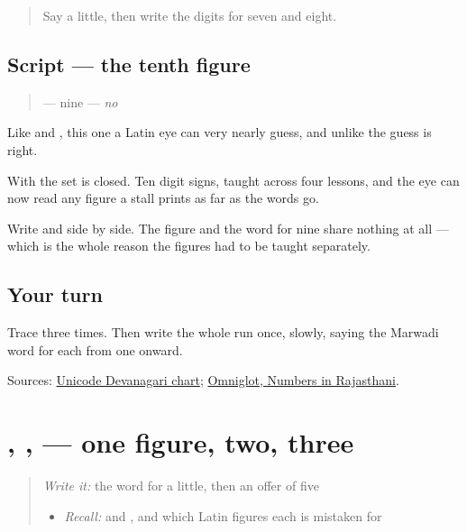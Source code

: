 \label{lesson:MW-W35-digit-nine}



\begin{quote}
Say a little, then write the digits for seven and eight.
\end{quote}

\subsection*{Script — the tenth figure}
\begin{quote}
\textbf{} — nine — \emph{no}
\end{quote}

Like \textbf{} and \textbf{}, this one a Latin eye can very nearly guess, and unlike \textbf{} the guess is right.

With \textbf{} the set is closed. Ten digit signs, taught across four lessons, and the eye can now read any figure a stall prints as far as the words go.

Write \textbf{} and \textbf{} side by side. The figure and the word for nine share nothing at all — which is the whole reason the figures had to be taught separately.

\subsection*{Your turn}
Trace \textbf{} three times. Then write the whole run \textbf{         } once, slowly, saying the Marwadi word for each from one onward.

\begin{tcolorbox}[breakable,colback=teal!4,colframe=teal!35!black,title={Before you move on}]
Sources: \href{https://www.unicode.org/charts/PDF/U0900.pdf}{Unicode Devanagari chart}; \href{https://www.omniglot.com/language/numbers/rajasthani.htm}{Omniglot, Numbers in Rajasthani}.
\end{tcolorbox}
\section[Practice]{, ,  — one figure, two, three}

\label{lesson:MW-C35-read-ticket}



\begin{quote}
\emph{Write it:} the word for a little, then an offer of five

\begin{itemize}
\raggedright
  \item \emph{Recall:} \textbf{} and \textbf{}, and which Latin figures each is mistaken for
\end{itemize}
\end{quote}

